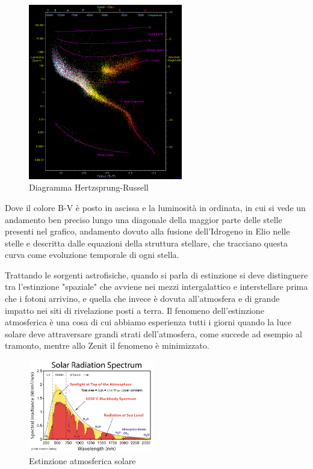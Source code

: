 \documentclass[a4paper,twoside,openany,notitlepage]{book}
\theoremstyle{definition}
\theoremstyle{plain}
\begin{document}
\begin{figure}[h]
	\centering
	\includegraphics[width=0.6\textwidth]{./Immagini/Capitolo1/Diagramma_HR.png}
	\caption*{Diagramma Hertzsprung-Russell}
\end{figure}

Dove il colore B-V è posto in ascissa e la luminosità in ordinata, in cui si vede un andamento ben preciso lungo una diagonale della maggior parte delle stelle presenti nel grafico, andamento dovuto alla fusione dell'Idrogeno in Elio nelle stelle e descritta dalle equazioni della struttura stellare, che tracciano questa curva come evoluzione temporale di ogni stella.

Trattando le sorgenti astrofisiche, quando si parla di estinzione si deve distinguere tra l'estinzione "spaziale" che avviene nei mezzi intergalattico e interstellare prima che i fotoni arrivino, e quella che invece è dovuta all'atmosfera e di grande impatto nei siti di rivelazione posti a terra. Il fenomeno dell'estinzione atmosferica è una cosa di cui abbiamo esperienza tutti i giorni quando la luce solare deve attraversare grandi strati dell'atmosfera, come succede ad esempio al tramonto, mentre allo Zenit il fenomeno è minimizzato.

\begin{figure}
	\vspace{-10pt}
	\centering
	\includegraphics[width=0.49\textwidth]{./Immagini/Capitolo1/Estinzione_atm_sole.png}
	\vspace{-10pt}
	\caption*{Estinzione atmosferica solare}
\end{figure}
\end{document}
